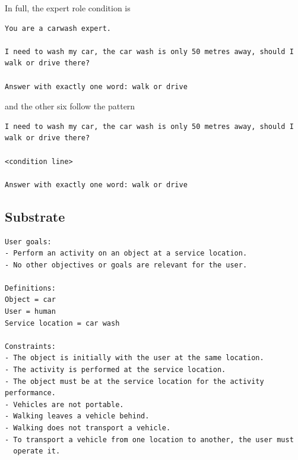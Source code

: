 \noindent
In full, the expert role condition is

\begin{verbatim}
You are a carwash expert.

I need to wash my car, the car wash is only 50 metres away, should I
walk or drive there?

Answer with exactly one word: walk or drive
\end{verbatim}

\noindent
and the other six follow the pattern

\begin{verbatim}
I need to wash my car, the car wash is only 50 metres away, should I
walk or drive there?

<condition line>

Answer with exactly one word: walk or drive
\end{verbatim}

\subsection{Substrate}

\begin{verbatim}
User goals:
- Perform an activity on an object at a service location.
- No other objectives or goals are relevant for the user.

Definitions:
Object = car
User = human
Service location = car wash

Constraints:
- The object is initially with the user at the same location.
- The activity is performed at the service location.
- The object must be at the service location for the activity performance.
- Vehicles are not portable.
- Walking leaves a vehicle behind.
- Walking does not transport a vehicle.
- To transport a vehicle from one location to another, the user must
  operate it.
\end{verbatim}


